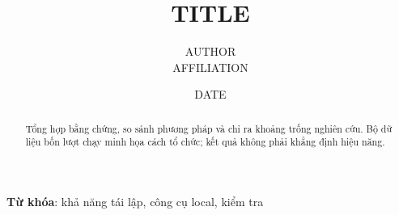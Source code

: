 \documentclass{article}
\title{{{TITLE}}}
\author{{{AUTHOR}} \\ {{AFFILIATION}}}
\date{{{DATE}}}
\begin{document}
\maketitle
\begin{abstract}Tổng hợp bằng chứng, so sánh phương pháp và chỉ ra khoảng trống nghiên cứu. Bộ dữ liệu bốn lượt chạy minh họa cách tổ chức; kết quả không phải khẳng định hiệu năng.\end{abstract}
\textbf{Từ khóa}: khả năng tái lập, công cụ local, kiểm tra





\end{document}
